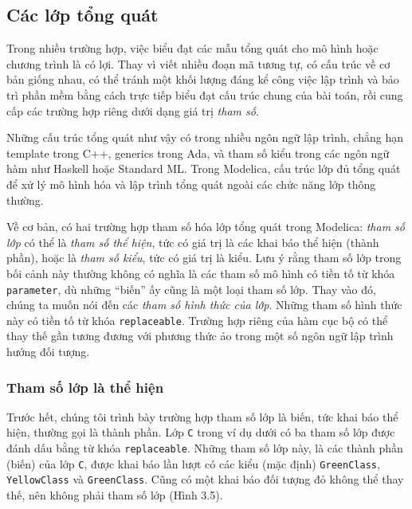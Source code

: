 \subsection{Các lớp tổng quát}
Trong nhiều trường hợp, việc biểu đạt các mẫu tổng quát cho mô hình hoặc chương trình là có lợi. Thay vì viết nhiều đoạn mã tương tự, có cấu trúc về cơ bản giống nhau, có thể tránh một khối lượng đáng kể công việc lập trình và bảo trì phần mềm bằng cách trực tiếp biểu đạt cấu trúc chung của bài toán, rồi cung cấp các trường hợp riêng dưới dạng giá trị \emph{tham số}.

Những cấu trúc tổng quát như vậy có trong nhiều ngôn ngữ lập trình, chẳng hạn template trong C++, generics trong Ada, và tham số kiểu trong các ngôn ngữ hàm như Haskell hoặc Standard ML. Trong Modelica, cấu trúc lớp đủ tổng quát để xử lý mô hình hóa và lập trình tổng quát ngoài các chức năng lớp thông thường.

Về cơ bản, có hai trường hợp tham số hóa lớp tổng quát trong Modelica: \emph{tham số lớp} có thể là \emph{tham số thể hiện}, tức có giá trị là các khai báo thể hiện (thành phần), hoặc là \emph{tham số kiểu}, tức có giá trị là kiểu. Lưu ý rằng tham số lớp trong bối cảnh này thường không có nghĩa là các tham số mô hình có tiền tố từ khóa \texttt{parameter}, dù những ``biến'' ấy cũng là một loại tham số lớp. Thay vào đó, chúng ta muốn nói đến các \emph{tham số hình thức của lớp}. Những tham số hình thức này có tiền tố từ khóa \texttt{replaceable}. Trường hợp riêng của hàm cục bộ có thể thay thế gần tương đương với phương thức ảo trong một số ngôn ngữ lập trình hướng đối tượng.

\subsubsection{Tham số lớp là thể hiện}
Trước hết, chúng tôi trình bày trường hợp tham số lớp là biến, tức khai báo thể hiện, thường gọi là thành phần. Lớp \texttt{C} trong ví dụ dưới có ba tham số lớp được đánh dấu bằng từ khóa \texttt{replaceable}. Những tham số lớp này, là các thành phần (biến) của lớp \texttt{C}, được khai báo lần lượt có các kiểu (mặc định) \texttt{GreenClass}, \texttt{YellowClass} và \texttt{GreenClass}. Cũng có một khai báo đối tượng đỏ không thể thay thế, nên không phải tham số lớp (Hình 3.5).


